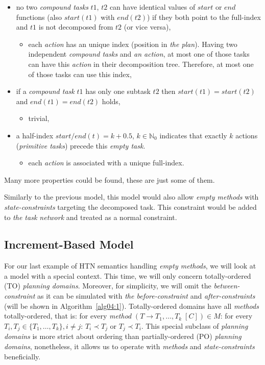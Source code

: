 \begin{itemize}
     \item no two \emph{compound tasks} $t1$, $t2$ can have identical values of $start$ or $end$ functions (also $start(t1)$ with $end(t2)$) if they both point to the full-index and $t1$ is not decomposed from $t2$ (or vice versa),
    \begin{itemize}
        \item each \emph{action} has an unique index (position in \emph{the plan}). Having two independent \emph{compound tasks} and \emph{an action}, at most one of those tasks can have this \emph{action} in their decomposition tree. Therefore, at most one of those tasks can use this index,
    \end{itemize}

    \item if a \emph{compound task} $t1$ has only one subtask $t2$ then $start(t1) = start(t2)$ and $end(t1) = end(t2)$ holds,
    \begin{itemize}
        \item trivial,
    \end{itemize}

    \item a half-index $start/end(t) = k + 0.5$, $k \in \mathbb{N}_0$ indicates that exactly $k$ actions (\emph{primitive tasks}) precede this \emph{empty task}.
    \begin{itemize}
        \item each \emph{action} is associated with a unique full-index.
    \end{itemize}
\end{itemize}

Many more properties could be found, these are just some of them.

\medskip\noindent
Similarly to the previous model, this model would also allow \emph{empty methods} with \emph{state-constraints} targeting the decomposed task. This constraint would be added to \emph{the task network} and treated as a normal constraint.

\subsection{Increment-Based Model}

\medskip\noindent
For our last example of HTN semantics handling \emph{empty methods}, we will look at a model with a special context. This time, we will only concern totally-ordered (TO) \emph{planning domains}. Moreover, for simplicity, we will omit the \emph{between-constraint} as it can be simulated with \emph{the before-constraint} and \emph{after-constraints} (will be shown in Algorithm~\ref{alg04:1}). Totally-ordered domains have all \emph{methods} totally-ordered, that is: for every \emph{method} $(T \rightarrow T_1,\dots, T_k \; [C]) \in M$: for every $T_i, T_j \in \{ T_1, \dots, T_k\}, i \neq j$: $T_i \prec T_j$ or $T_j \prec T_i$. This special subclass of \emph{planning domains} is more strict about ordering than partially-ordered (PO) \emph{planning domains}, nonetheless, it allows us to operate with \emph{methods} and \emph{state-constraints} beneficially. 

